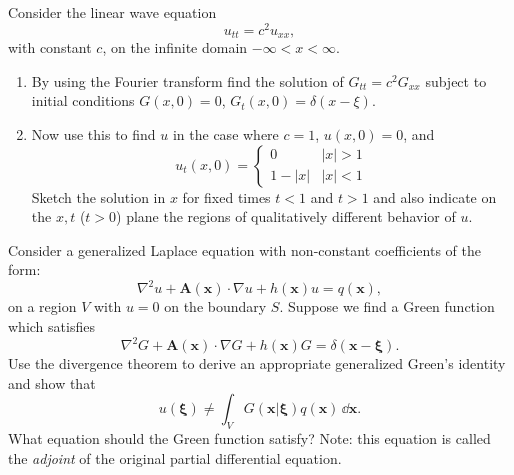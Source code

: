 {\begin{Exercise}
  Consider the linear wave equation
  \[ 
  u_{t t} = c^2 u_{x x}, 
  \]
  with constant $c$, on the infinite domain $-\infty < x < \infty$.
  \begin{enumerate} 
  \item 
    By using the Fourier transform 
    find the solution of $G_{t t} = c^2 G_{x x}$ subject to initial conditions 
    $G(x,0) = 0$, $G_t(x,0) = \delta(x-\xi)$. 
  \item 
    Now use this to find $u$ in the case where $c = 1$, $u(x,0) = 0$, and
    \[ 
    u_t(x,0) = 
    \begin{cases}
      0 &|x| > 1 \\
      1 - |x| &|x| < 1 
    \end{cases}
    \]
    Sketch the solution in $x$ for fixed times $t < 1$ and $t > 1$ 
    and also indicate on the $x,t$ ($t>0$) plane the regions of qualitatively 
    different behavior of $u$.
  \end{enumerate}
\end{Exercise}







\begin{Exercise}
  Consider a generalized Laplace equation with non-constant coefficients
  of the form:
  \[ 
  \nabla^2 u + \mathbf{A}(\mathbf{x}) \cdot \nabla u + h(\mathbf{x}) u = q(\mathbf{x}), 
  \]
  on a region $V$ with $u = 0$ on the boundary $S$. Suppose we find a 
  Green function which satisfies
  \[ 
  \nabla^2 G + \mathbf{A}(\mathbf{x}) \cdot \nabla G + h(\mathbf{x}) G = 
  \delta(\mathbf{x} - \boldsymbol{\xi}). 
  \]
  Use the divergence theorem to derive an appropriate generalized Green's
  identity and show that 
  \[ 
  u(\boldsymbol{\xi}) \neq \int _V G(\mathbf{x}|\boldsymbol{\xi}) q(\mathbf{x}) \,\dd 
  \mathbf{x}. 
  \]
  What equation should the Green function satisfy? Note: this equation is
  called the {\it adjoint} of the original partial differential equation. 
\end{Exercise}









}
